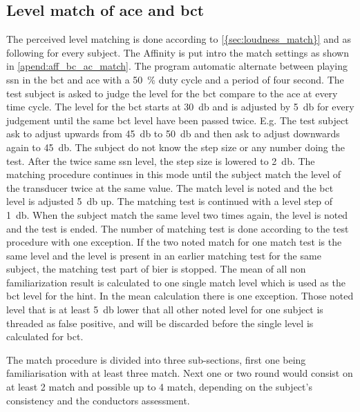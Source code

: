 \subsection{Level match of \gls{ace} and \gls{bct}}
The perceived level matching is done according to \autoref{{sec:loudness_match}} and as following for every subject. The Affinity is put intro the match settings as shown in \autoref{apend:aff_bc_ac_match}. The program automatic alternate between playing \gls{ssn} in the \gls{bct} and \gls{ace} with a \SI{50}{\percent} duty cycle and a period of four second. The test subject is asked to judge the level for the \gls{bct} compare to the \gls{ace} at every time cycle. The level for the \gls{bct} starts at \SI{30}{\decibel} and is adjusted by \SI{5}{\decibel} for every judgement until the same \gls{bct} level have been passed twice. E.g. The test subject ask to adjust upwards from \SI{45}{\decibel} to \SI{50}{\decibel} and then ask to adjust downwards again to \SI{45}{\decibel}. The subject do not know the step size or any number doing the test. After the twice same \gls{ssn} level, the step size is lowered to \SI{2}{\decibel}. The matching procedure continues in this mode until the subject match the level of the transducer twice at the same value. The match level is noted and the  \gls{bct} level is adjusted \SI{5}{\decibel} up. The matching test is continued with a level step of \SI{1}{\decibel}. When the subject match the same level two times again, the level is noted and the test is ended. The number of matching test is done according to the test procedure with one exception. If the two noted match for one match test is the same level and the level is present in an earlier matching test for the same subject, the matching test part of \gls{bier} is stopped. The mean of all non familiarization result is calculated to one single match level which is used as the \gls{bct} level for the \gls{hint}. In the mean calculation there is one exception. Those noted level that is at least \SI{5}{\decibel} lower that all other noted level for one subject is threaded as false positive, and will be discarded before the single level is calculated for \gls{bct}. 

The match procedure is divided into three sub-sections, first one being familiarisation with at least three match. Next one or two round would consist on at least 2 match and possible up to 4 match, depending on the subject's consistency and the conductors assessment. 


